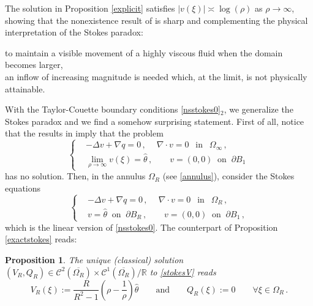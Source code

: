 \documentclass[a4paper,11pt]{article}
\newtheorem{proposition}[theorem]{Proposition}
\numberwithin{equation}{section}
\numberwithin{figure}{section}
\begin{document}
The solution in Proposition \ref{explicit} satisfies $|v(\xi)|\asymp\log(\rho)$ as $\rho\to\infty$, showing that the nonexistence result of
\cite{chang1961solutions} is sharp and complementing the physical interpretation of the Stokes paradox:
\begin{center}
to maintain a visible movement of a highly viscous fluid when the domain becomes larger,\\
an inflow of increasing magnitude is needed which, at the limit, is not physically attainable.
\end{center}
With the Taylor-Couette boundary conditions \eqref{nsstokes0}$_2$, we generalize the Stokes paradox and we find a somehow surprising statement.
First of all, notice that the results in \cite{chang1961solutions} imply that the problem
\begin{equation}\label{stoextrot}
\left\{
\begin{aligned}
	& -\Delta v + \nabla q=0 \, ,\ \quad  \nabla\cdot v=0 \ \ \mbox{ in } \ \ \Omega_{\infty} \, , \\[3pt]
	& \lim\limits_{\rho \to \infty} v(\xi) = \widehat{\theta}\, , \qquad v = (0,0) \ \text{ on } \ \partial B_{1} \,
\end{aligned}
\right.
\end{equation}
has no solution. Then, in the annulus $\Omega_R$ (see \eqref{annulus}), consider the Stokes equations
\begin{equation}\label{stokesV}
\left\{
\begin{aligned}
	& -\Delta v+\nabla q=0 \, , \ \quad  \nabla\cdot v=0 \ \ \mbox{ in } \ \ \Omega_{R} \, , \\[3pt]
	& v = \widehat{\theta} \ \text{ on } \ \partial B_R \, , \qquad v = (0,0) \ \text{ on } \ \partial B_{1} \, ,
\end{aligned}
\right.
\end{equation}
which is the linear version of \eqref{nsstokes0}. The counterpart of Proposition \ref{exactstokes} reads:

\begin{proposition} \label{exactstokestheta}
The unique (classical) solution $(V_R,Q_R)\in\mathcal{C}^{2}(\overline{\Omega_{R}}) \times \mathcal{C}^{1}(\overline{\Omega_{R}})/\mathbb{R}$ to \eqref{stokesV} reads
\begin{equation} \label{tcs1}
	V_{R}(\xi) := \dfrac{R}{R^2 - 1} \left( \rho - \dfrac{1}{\rho} \right) \widehat{\theta} \qquad \text{and} \qquad Q_{R}(\xi) := 0
\qquad \forall \xi \in \Omega_{R} \, .
\end{equation}
\end{proposition}
\end{document}
